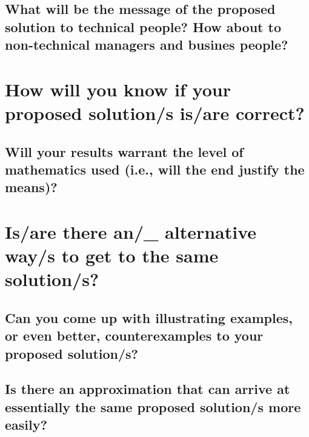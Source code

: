 \graytx{\blindtext}
				
						
\subsection*{\thesubsection\quad What will be the message of the proposed solution to technical people?  How about to non-technical managers and busines people?}
			
\graytx{\blindtext}





\section*{\thesection\quad How will you know if your proposed solution/s is/are correct?}

\graytx{\blindtext} 
			
			
\subsection*{\thesubsection\quad Will your results warrant the level of mathematics used (i.e., will the end justify the means)?}
	    
\graytx{\blindtext}
			





\section*{\thesection\quad Is/are there an/\_ alternative way/s to get to the same solution/s?}

\graytx{\blindtext}
	
	
\subsection*{\thesubsection\quad Can you come up with illustrating examples, or even better, counterexamples to your proposed solution/s?}

\graytx{\blindtext}
	
	
\subsection*{\thesubsection\quad Is there an approximation that can arrive at essentially the same proposed solution/s more easily?}
	
